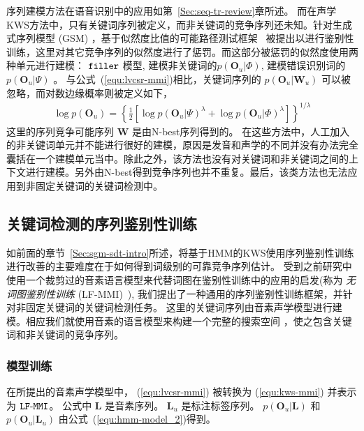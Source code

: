 序列建模方法在语音识别中的应用如第~\ref{Sec:seq-tr-review}章所述。
而在声学KWS方法中，只有关键词序列被定义，而非关键词的竞争序列还未知。针对生成式序列模型 (GSM) ，基于似然度比值的可能路径测试框架~\cite{sukkar1996utterance} 被提出以进行鉴别性训练，这里对其它竞争序列的似然度进行了惩罚。而这部分被惩罚的似然度使用两种单元进行建模： $\tt filler$ 模型, 建模非关键词的$p(\mathbf{O}_u|\Phi)$, 建模错误识别词的 $p(\mathbf{O}_u|\Psi)$ 。 与公式~(\ref{equ:lvcsr-mmi})相比，关键词序列的  $p(\mathbf{O}_u|\mathbf{W}_u)$ 可以被忽略，而对数边缘概率则被定义如下，
\begin{equation}
\label{equ:wbmve-po}
\begin{split}
\log p(\mathbf{O}_u)=\left\{\frac{1}{2}[\log p(\mathbf{O}_u|\Psi)^\lambda + \log p(\mathbf{O}_u|\Phi)^\lambda]\right\}^{1/\lambda}
\end{split}
\end{equation}
这里的序列竞争可能序列 $\mathbf{W}$ 是由N-best序列得到的。
在这些方法中，人工加入的非关键词单元并不能进行很好的建模，原因是发音和声学的不同并没有办法完全囊括在一个建模单元当中。除此之外，该方法也没有对关键词和非关键词之间的上下文进行建模。另外由N-best得到竞争序列也并不重复。最后，该类方法也无法应用到非固定关键词的关键词检测中。



\subsection{关键词检测的序列鉴别性训练}
\label{Sec:kws-disc-proposed}

如前面的章节~\ref{Sec:sgm-sdt-intro}所述，将基于HMM的KWS使用序列鉴别性训练进行改善的主要难度在于如何得到词级别的可靠竞争序列估计。
受到之前研究中使用一个裁剪过的音素语言模型来代替词图在鉴别性训练中的应用的启发(称为 {\em 无词图鉴别性训练} (LF-MMI)~\cite{povey2016purely,chen2006advances}), 我们提出了一种通用的序列鉴别性训练框架，并针对非固定关键词的关键词检测任务。
这里的关键词序列由音素声学模型进行建模。相应我们就使用音素的语言模型来构建一个完整的搜索空间 ，使之包含关键词和非关键词的竞争序列。

\subsubsection{模型训练}
\label{Sec:lfmmi-train}

在所提出的音素声学模型中， (\ref{equ:lvcsr-mmi}) 被转换为 (\ref{equ:kws-mmi}) 并表示为 $\tt{LF\text{-}MMI}$。
公式中 $\mathbf{L}$ 是音素序列。 $\mathbf{L}_u$ 是标注标签序列。
$p(\mathbf{O}_u|\mathbf{L})$ 和 $p(\mathbf{O}_u|\mathbf{L}_u)$ 由公式~(\ref{equ:hmm-model_2})得到。 


